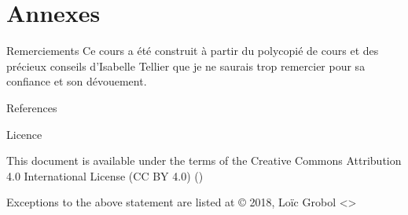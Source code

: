 \documentclass[hyperref={unicode}, xcolor={svgnames}, french]{beamer}
\begin{document}

\appendix
{}  %
\section{Annexes}
\begin{frame}{Remerciements}
    Ce cours a été construit à partir du polycopié de cours  \parencite{tellier2017fouille} et des précieux conseils d'Isabelle Tellier que je ne saurais trop remercier pour sa confiance et son dévouement.
\end{frame}

\begin{frame}[allowframebreaks]{References}
    \printbibliography[heading=none]
\end{frame}

\begin{frame}{Licence}
    \begin{center}
        {\huge \ccby}
        \vfill
        This document is available under the terms of the Creative Commons Attribution 4.0 International License (CC BY 4.0) ()

        Exceptions to the above statement are listed at {\small{}}
        \vfill
        © 2018, Loïc Grobol <>

    \end{center}
\end{frame}
\end{document}
